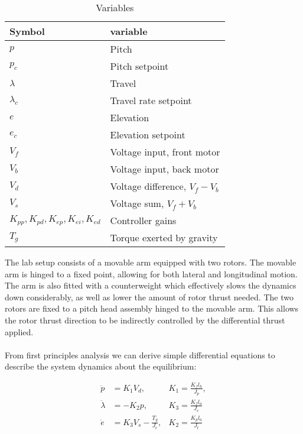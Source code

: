 \begin{table}[p]
	\centering
	\caption{Variables}
	\begin{tabular}{ll}
		\hline
		Symbol & variable \\
		\hline
		$p$ & Pitch \\
		$p_c$ & Pitch setpoint \\
		$\lambda$ & Travel \\
		$\lambda_c$ & Travel rate setpoint \\
		$e$ & Elevation \\
		$e_c$ & Elevation setpoint \\
		$V_f$ & Voltage input, front motor \\
		$V_b$ & Voltage input, back motor \\
		$V_d$ & Voltage difference, $V_f - V_b$ \\
		$V_s$ & Voltage sum, $V_f + V_b$ \\
		$K_{pp}, K_{pd}, K_{ep}, K_{ei}, K_{ed}$ & Controller gains \\
		$T_g$ & Torque exerted by gravity \\
		\hline
	\end{tabular}
	\label{tab:variables}
\end{table}
The lab setup consists of a movable arm equipped with two rotors. The movable arm is hinged to a fixed point, allowing for both lateral and longitudinal motion. The arm is also fitted with a counterweight which effectively slows the dynamics down considerably, as well as lower the amount of rotor thrust needed. The two rotors are fixed to a pitch head assembly hinged to the movable arm. This allows the rotor thrust direction to be indirectly controlled by the differential thrust applied.

\paragraph{}
From first principles analysis we can derive simple differential equations to describe the system dynamics about the equilibrium:

\begin{subequations}
	\label{eq:dynamics}
	\begin{align}
		\ddot{p} &= K_1 V_d, &K_1 = \frac{K_f l_h}{J_p},\\
		\ddot{\lambda} &= -K_2 p, &K_3 = \frac{K_f l_a}{J_e}\\
		\ddot{e} &= K_3 V_s - \frac{T_g}{J_e}, &K_2 = \frac{K_p l_a}{J_t}
	\end{align}
\end{subequations}
\begin{equation*}
\end{equation*}

